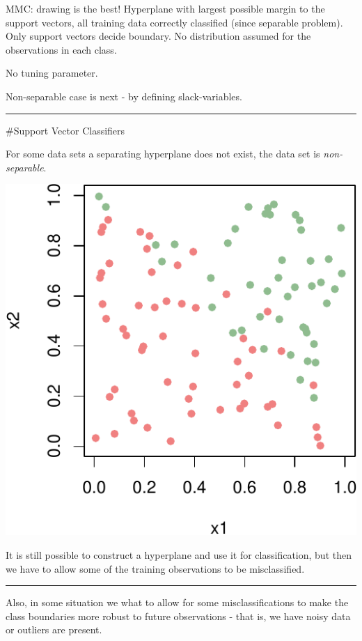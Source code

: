 \documentclass[]{article}
\begin{document}
MMC: drawing is the best! Hyperplane with largest possible margin to the
support vectors, all training data correctly classified (since separable
problem). Only support vectors decide boundary. No distribution assumed
for the observations in each class.

No tuning parameter.

Non-separable case is next - by defining slack-variables.

\begin{center}\rule{0.5\linewidth}{\linethickness}\end{center}

\#Support Vector Classifiers

For some data sets a separating hyperplane does not exist, the data set
is \emph{non-separable}.

\includegraphics{9SVM_files/figure-latex/unnamed-chunk-9-1.pdf}

It is still possible to construct a hyperplane and use it for
classification, but then we have to allow some of the training
observations to be misclassified.

\begin{center}\rule{0.5\linewidth}{\linethickness}\end{center}

Also, in some situation we what to allow for some misclassifications to
make the class boundaries more robust to future observations - that is,
we have noisy data or outliers are present.
\end{document}
